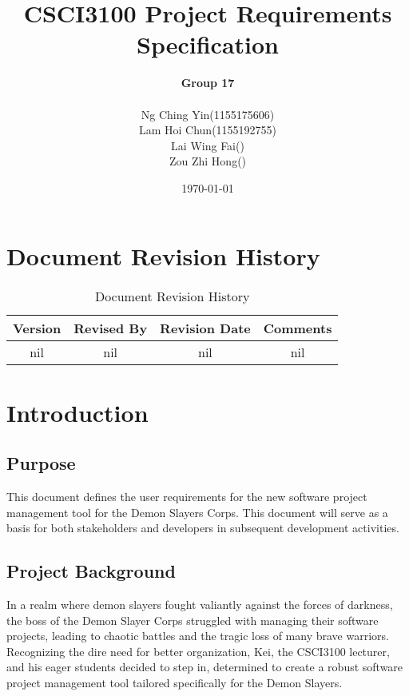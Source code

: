 \documentclass[11pt]{article}
\title{CSCI3100 Project Requirements Specification}
\author{
    \textbf{Group 17} \\[1em]
    \begin{tabular}{ll}
        Ng Ching Yin & (1155175606) \\
        Lam Hoi Chun & (1155192755) \\
        Lai Wing Fai & () \\
        Zou Zhi Hong & ()
    \end{tabular}
}
\date{\today}
\begin{document}
\maketitle

{
    \hypersetup{linkcolor=black}
    \tableofcontents
}

\newpage

\section{Document Revision History}
\begin{table}[h]
    \centering
    \caption{Document Revision History}
    \begin{tabular}{cccc}
        \toprule
        Version & Revised By & Revision Date & Comments \\
        \midrule
        nil & nil & nil & nil \\
        \bottomrule
    \end{tabular}
    \label{tab:docs_rev_hist}
\end{table}

\section{Introduction}

\subsection{Purpose}

This document defines the user requirements for the new software project management
tool for the Demon Slayers Corps. This document will serve as a basis for both
stakeholders and developers in subsequent development activities.

\subsection{Project Background}

In a realm where demon slayers fought valiantly against the forces of darkness, the boss of
the Demon Slayer Corps struggled with managing their software projects, leading to chaotic
battles and the tragic loss of many brave warriors. Recognizing the dire need for better
organization, Kei, the CSCI3100 lecturer, and his eager students decided to step in, determined
to create a robust software project management tool tailored specifically for the Demon Slayers.
\end{document}
